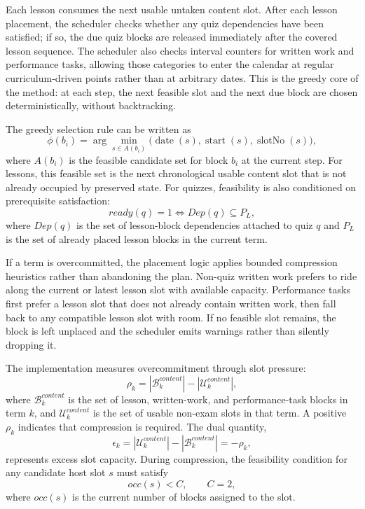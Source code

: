 \documentclass[conference]{IEEEtran}
\begin{document}
Each lesson consumes the next usable untaken content slot. After each lesson
placement, the scheduler checks whether any quiz dependencies have been satisfied;
if so, the due quiz blocks are released immediately after the covered lesson
sequence. The scheduler also checks interval counters for written work and
performance tasks, allowing those categories to enter the calendar at regular
curriculum-driven points rather than at arbitrary dates. This is the greedy core
of the method: at each step, the next feasible slot and the next due block are
chosen deterministically, without backtracking.

The greedy selection rule can be written as
\begin{equation}
\phi(b_i)=
\arg\min_{s \in A(b_i)}
\bigl(\operatorname{date}(s),\operatorname{start}(s),\operatorname{slotNo}(s)\bigr),
\end{equation}
where \(A(b_i)\) is the feasible candidate set for block \(b_i\) at the current
step. For lessons, this feasible set is the next chronological usable content
slot that is not already occupied by preserved state. For quizzes, feasibility is
also conditioned on prerequisite satisfaction:
\begin{equation}
ready(q)=1
\iff
Dep(q)\subseteq P_L,
\end{equation}
where \(Dep(q)\) is the set of lesson-block dependencies attached to quiz \(q\)
and \(P_L\) is the set of already placed lesson blocks in the current term.

If a term is overcommitted, the placement logic applies bounded compression
heuristics rather than abandoning the plan. Non-quiz written work prefers to ride
along the current or latest lesson slot with available capacity. Performance tasks
first prefer a lesson slot that does not already contain written work, then fall
back to any compatible lesson slot with room. If no feasible slot remains, the
block is left unplaced and the scheduler emits warnings rather than silently
dropping it.

The implementation measures overcommitment through slot pressure:
\begin{equation}
\rho_k = |\mathcal{B}^{content}_k| - |\mathcal{U}^{content}_k|,
\end{equation}
where \(\mathcal{B}^{content}_k\) is the set of lesson, written-work, and
performance-task blocks in term \(k\), and \(\mathcal{U}^{content}_k\) is the set
of usable non-exam slots in that term. A positive \(\rho_k\) indicates that
compression is required. The dual quantity,
\begin{equation}
\epsilon_k = |\mathcal{U}^{content}_k| - |\mathcal{B}^{content}_k| = -\rho_k,
\end{equation}
represents excess slot capacity. During compression, the feasibility condition for
any candidate host slot \(s\) must satisfy
\begin{equation}
occ(s) < C, \qquad C = 2,
\end{equation}
where \(occ(s)\) is the current number of blocks assigned to the slot.
\end{document}
